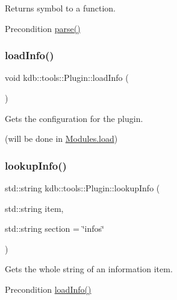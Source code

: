 Returns symbol to a function. 

\begin{DoxyPrecond}{Precondition}
\hyperlink{classkdb_1_1tools_1_1Plugin_adfcba2fbdeb436a1083410df804d5fb0}{parse()} 
\end{DoxyPrecond}
\mbox{\label{classkdb_1_1tools_1_1Plugin_a3a0c6a956d1714002ef9baf8c9d99167}} 
\subsubsection{\texorpdfstring{load\+Info()}{loadInfo()}}
{\footnotesize\ttfamily void kdb\+::tools\+::\+Plugin\+::load\+Info (\begin{DoxyParamCaption}{ }\end{DoxyParamCaption})}



Gets the configuration for the plugin. 

(will be done in \hyperlink{classkdb_1_1tools_1_1Modules_ae8d8c91745c9f517e6e8a556f1664f69}{Modules.\+load}) \mbox{\label{classkdb_1_1tools_1_1Plugin_a5f1dc42adda8340f330eb902812e667d}} 
\subsubsection{\texorpdfstring{lookup\+Info()}{lookupInfo()}}
{\footnotesize\ttfamily std\+::string kdb\+::tools\+::\+Plugin\+::lookup\+Info (\begin{DoxyParamCaption}\item[{std\+::string}]{item,  }\item[{std\+::string}]{section = {\ttfamily \char`\"{}infos\char`\"{}} }\end{DoxyParamCaption})}



Gets the whole string of an information item. 

\begin{DoxyPrecond}{Precondition}
\hyperlink{classkdb_1_1tools_1_1Plugin_a3a0c6a956d1714002ef9baf8c9d99167}{load\+Info()} 
\end{DoxyPrecond}
\mbox{\label{classkdb_1_1tools_1_1Plugin_ae4b82f943d0cdb0dd355924aa3201d6f}} 
